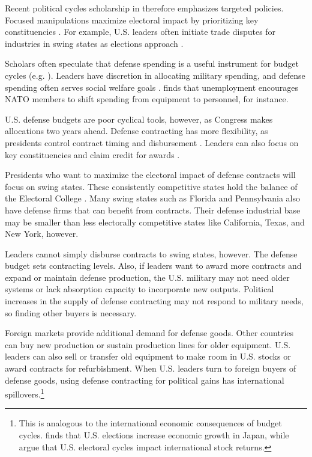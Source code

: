 \documentclass[12pt]{article}
\begin{document}
Recent political cycles scholarship in therefore emphasizes targeted policies.
Focused manipulations maximize electoral impact by prioritizing key constituencies \citep[pg. 248]{Dubois2016}.
For example, U.S. leaders often initiate trade disputes for industries in swing states as elections approach \citep{Conconietal2017}.%


Scholars often speculate that defense spending is a useful instrument for budget cycles (e.g. \cite{Tufte1978, Mintz1988}).
Leaders have discretion in allocating military spending, and defense spending often serves social welfare goals \citep{WhittenWilliams2011}.
\citet{Becker2021} finds that unemployment encourages NATO members to shift spending from equipment to personnel, for instance.


U.S. defense budgets are poor cyclical tools, however, as Congress makes allocations two years ahead.
Defense contracting has more flexibility, as presidents control contract timing and disbursement \citep{Mayer1995, DerouenHeo2000}.
Leaders can also focus on key constituencies and claim credit for awards \citep{DerouenHeo2000}. 


Presidents who want to maximize the electoral impact of defense contracts will focus on swing states.
These consistently competitive states hold the balance of the Electoral College \citep{KrinerReeves2015}. 
Many swing states such as Florida and Pennsylvania also have defense firms that can benefit from contracts.
Their defense industrial base may be smaller than less electorally competitive states like California, Texas, and New York, however. 


Leaders cannot simply disburse contracts to swing states, however. 
The defense budget sets contracting levels. 
Also, if leaders want to award more contracts and expand or maintain defense production, the U.S. military may not need older systems or lack absorption capacity to incorporate new outputs.
Political increases in the supply of defense contracting may not respond to military needs, so finding other buyers is necessary.


Foreign markets provide additional demand for defense goods.
Other countries can buy new production or sustain production lines for older equipment. 
U.S. leaders can also sell or transfer old equipment to make room in U.S. stocks or award contracts for refurbishment. 
When U.S. leaders turn to foreign buyers of defense goods, using defense contracting for political gains has international spillovers.\footnote{%
This is analogous to the international economic consequences of budget cycles. 
\citet{Ito1991} finds that U.S. elections increase economic growth in Japan, while \citet{FoersterSchmitz1997} argue that U.S. electoral cycles impact international stock returns.
}
\end{document}
